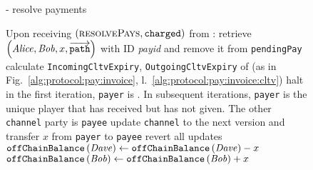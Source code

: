   \begin{figure}[H]
    \begin{systembox}{\fpaynet - resolve payments}
      \begin{algorithmic}[1]
        \State Upon receiving $\left(\textsc{resolvePays},
        \mathtt{charged}\right)$ from \simulator:
        \Indent
              \State retrieve $\left(\mathit{Alice}, \mathit{Bob}, x,
              \overrightarrow{\mathtt{path}}\right)$ with ID \textit{payid} and
              remove it from \texttt{pendingPay}
              \State calculate \texttt{IncomingCltvExpiry},
              \texttt{OutgoingCltvExpiry} of \dave{} (as in
              Fig.~\ref{alg:protocol:pay:invoice},
              l.~\ref{alg:protocol:pay:invoice:cltv})
              \If{$\dave{} = \bot$}
                \State \Return
                \State halt
              \EndIf
                \State in the first iteration, \texttt{payer} is \dave. In
                subsequent iterations, \texttt{payer} is the unique player that
                has received but has not given. The other \texttt{channel} party
                is \texttt{payee}
                  \State update \texttt{channel} to the next version and
                  transfer $x$ from \texttt{payer} to \texttt{payee}
                \Else
                  \State revert all updates
                \EndIf
              \EndFor
                \State $\mathtt{offChainBalance}\left(\mathit{Dave}\right) \gets
                \mathtt{offChainBalance}\left(\mathit{Dave}\right) - x$
              \EndIf
              \State $\mathtt{offChainBalance}\left(\mathit{Bob}\right) \gets
              \mathtt{offChainBalance}\left(\mathit{Bob}\right) + x$
            \EndFor
          \EndFor
        \EndIndent
      \end{algorithmic}
    \end{systembox}
    \caption{}
    \label{alg:fpaynet:resolvepay}
  \end{figure}

